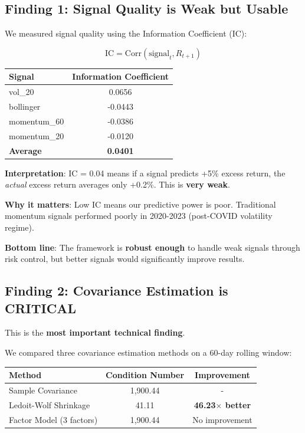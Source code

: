 \documentclass[a4paper,12pt]{article}
\begin{document}
\subsection{Finding 1: Signal Quality is Weak but Usable}

We measured signal quality using the Information Coefficient (IC):

\begin{equation}
\text{IC} = \text{Corr}(\text{signal}_t, R_{t+1})
\end{equation}

\begin{table}[H]
\centering
\begin{tabular}{lc}
\toprule
\textbf{Signal} & \textbf{Information Coefficient} \\
\midrule
vol\_20 & 0.0656 \\
bollinger & -0.0443 \\
momentum\_60 & -0.0386 \\
momentum\_20 & -0.0120 \\
\midrule
\textbf{Average} & \textbf{0.0401} \\
\bottomrule
\end{tabular}
\end{table}

\textbf{Interpretation}: IC = 0.04 means if a signal predicts +5\% excess return, the \textit{actual} excess return averages only +0.2\%. This is \textbf{very weak}.

\textbf{Why it matters}: Low IC means our predictive power is poor. Traditional momentum signals performed poorly in 2020-2023 (post-COVID volatility regime).

\textbf{Bottom line}: The framework is \textbf{robust enough} to handle weak signals through risk control, but better signals would significantly improve results.

\subsection{Finding 2: Covariance Estimation is CRITICAL}

This is the \textbf{most important technical finding}.

We compared three covariance estimation methods on a 60-day rolling window:

\begin{table}[H]
\centering
\begin{tabular}{lcc}
\toprule
\textbf{Method} & \textbf{Condition Number} & \textbf{Improvement} \\
\midrule
Sample Covariance & 1,900.44 & - \\
Ledoit-Wolf Shrinkage & 41.11 & \textbf{46.23$\times$ better} \\
Factor Model (3 factors) & 1,900.44 & No improvement \\
\bottomrule
\end{tabular}
\end{table}
\end{document}
